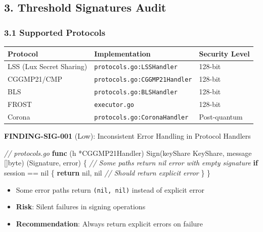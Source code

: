 \documentclass[
]{article}
\newenvironment{Shaded}{}{}
\newcommand{\CommentTok}[1]{\textcolor[rgb]{0.38,0.63,0.69}{\textit{#1}}}
\newcommand{\ControlFlowTok}[1]{\textcolor[rgb]{0.00,0.44,0.13}{\textbf{#1}}}
\newcommand{\DataTypeTok}[1]{\textcolor[rgb]{0.56,0.13,0.00}{#1}}
\newcommand{\KeywordTok}[1]{\textcolor[rgb]{0.00,0.44,0.13}{\textbf{#1}}}
\newcommand{\NormalTok}[1]{#1}
\newcommand{\OperatorTok}[1]{\textcolor[rgb]{0.40,0.40,0.40}{#1}}
\newcommand{\OtherTok}[1]{\textcolor[rgb]{0.00,0.44,0.13}{#1}}
\newcounter{none} %
\providecommand{\tightlist}{%
  \setlength{\itemsep}{0pt}\setlength{\parskip}{0pt}}
\begin{document}
\subsection{3. Threshold Signatures
Audit}\label{3-threshold-signatures-audit}

\subsubsection{3.1 Supported Protocols}\label{31-supported-protocols}

{\def\LTcaptype{none} %
\begin{longtable}[]{@{}lll@{}}
\toprule\noalign{}
Protocol & Implementation & Security Level \\
\midrule\noalign{}
\endhead
\bottomrule\noalign{}
\endlastfoot
LSS (Lux Secret Sharing) & \texttt{protocols.go:LSSHandler} & 128-bit \\
CGGMP21/CMP & \texttt{protocols.go:CGGMP21Handler} & 128-bit \\
BLS & \texttt{protocols.go:BLSHandler} & 128-bit \\
FROST & \texttt{executor.go} & 128-bit \\
Corona & \texttt{protocols.go:CoronaHandler} & Post-quantum \\
\end{longtable}
}

\textbf{FINDING-SIG-001} (Low): Inconsistent Error Handling in Protocol
Handlers

\begin{Shaded}
\begin{Highlighting}[]
\CommentTok{// protocols.go}
\KeywordTok{func} \OperatorTok{(}\NormalTok{h }\OperatorTok{*}\NormalTok{CGGMP21Handler}\OperatorTok{)}\NormalTok{ Sign}\OperatorTok{(}\NormalTok{keyShare KeyShare}\OperatorTok{,}\NormalTok{ message }\OperatorTok{[]}\DataTypeTok{byte}\OperatorTok{)} \OperatorTok{(}\NormalTok{Signature}\OperatorTok{,} \DataTypeTok{error}\OperatorTok{)} \OperatorTok{\{}
    \CommentTok{// Some paths return nil error with empty signature}
    \ControlFlowTok{if}\NormalTok{ session }\OperatorTok{==} \OtherTok{nil} \OperatorTok{\{}
        \ControlFlowTok{return} \OtherTok{nil}\OperatorTok{,} \OtherTok{nil}  \CommentTok{// Should return explicit error}
    \OperatorTok{\}}
\OperatorTok{\}}
\end{Highlighting}
\end{Shaded}

\begin{itemize}
\tightlist
\item
  Some error paths return \texttt{(nil,\ nil)} instead of explicit error
\item
  \textbf{Risk}: Silent failures in signing operations
\item
  \textbf{Recommendation}: Always return explicit errors on failure
\end{itemize}
\end{document}
